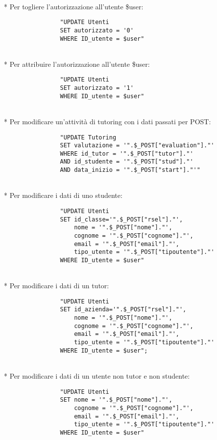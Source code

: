 \documentclass[12pt]{article}
\begin{document}
\\*
\noindent
Per togliere l'autorizzazione all'utente \$user:
\begin{verbatim}
                "UPDATE Utenti
                SET autorizzato = '0'
                WHERE ID_utente = $user"
\end{verbatim}

\\*
\noindent
Per attribuire l'autorizzazione all'utente \$user:
\begin{verbatim}
                "UPDATE Utenti
                SET autorizzato = '1'
                WHERE ID_utente = $user"
\end{verbatim}

\\*
\noindent
Per modificare un'attività di tutoring con i dati passati per POST:
\begin{verbatim}
                "UPDATE Tutoring
                SET valutazione = '".$_POST["evaluation"]."'
                WHERE id_tutor = '".$_POST["tutor"]."'
                AND id_studente = '".$_POST["stud"]."'
                AND data_inizio = '".$_POST["start"]."'"
\end{verbatim}


\\*
\noindent
Per modificare i dati di uno studente:
\begin{verbatim}
                "UPDATE Utenti
                SET id_classe='".$_POST["rsel"]."',
                    nome = '".$_POST["nome"]."',
                    cognome = '".$_POST["cognome"]."',
                    email = '".$_POST["email"]."',
                    tipo_utente = '".$_POST["tipoutente"]."'
                WHERE ID_utente = $user"
\end{verbatim}

\\*
\noindent
Per modificare i dati di un tutor:
\begin{verbatim}
                "UPDATE Utenti
                SET id_azienda='".$_POST["rsel"]."',
                    nome = '".$_POST["nome"]."',
                    cognome = '".$_POST["cognome"]."',
                    email = '".$_POST["email"]."',
                    tipo_utente = '".$_POST["tipoutente"]."'
                WHERE ID_utente = $user";
\end{verbatim}

\\*
\noindent
Per modificare i dati di un utente non tutor e non studente:
\begin{verbatim}
                "UPDATE Utenti
                SET nome = '".$_POST["nome"]."',
                    cognome = '".$_POST["cognome"]."',
                    email = '".$_POST["email"]."',
                    tipo_utente = '".$_POST["tipoutente"]."'
                WHERE ID_utente = $user"
\end{verbatim}
\end{document}
